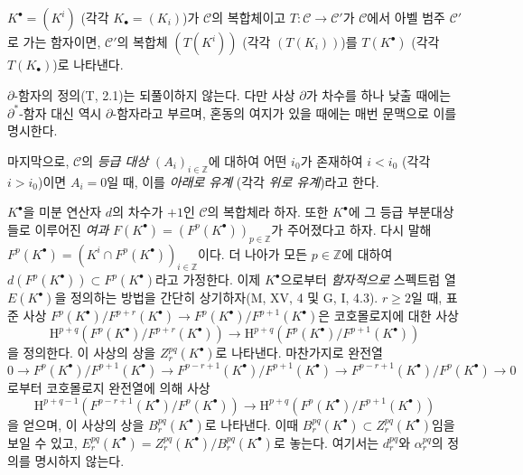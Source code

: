\begin{env}[11.2.1]
$K^\bullet=(K^i)$ (각각 $K_\bullet=(K_i)$)가 $\mathcal C$의 복합체이고
$T:\mathcal C\to\mathcal C'$가 $\mathcal C$에서 아벨 범주 $\mathcal C'$로
가는 함자이면, $\mathcal C'$의 복합체 $(T(K^i))$ (각각 $(T(K_i))$)를
$T(K^\bullet)$ (각각 $T(K_\bullet)$)로 나타낸다.

$\partial$-함자의 정의(T, 2.1)는 되풀이하지 않는다. 다만 사상
$\partial$가 차수를 하나 낮출 때에는 $\partial^*$-함자 대신 역시
$\partial$-함자라고 부르며, 혼동의 여지가 있을 때에는 매번 문맥으로 이를
명시한다.

마지막으로, $\mathcal C$의 \emph{등급 대상} $(A_i)_{i\in\mathbb Z}$에
대하여 어떤 $i_0$가 존재하여 $i<i_0$ (각각 $i>i_0$)이면 $A_i=0$일 때,
이를 \emph{아래로 유계} (각각 \emph{위로 유계})라고 한다.
\end{env}

\begin{env}[11.2.2]
\label{0.11.2.2-fr}
$K^\bullet$을 미분 연산자 $d$의 차수가 $+1$인 $\mathcal C$의 복합체라
하자. 또한 $K^\bullet$에 그 등급 부분대상들로 이루어진 \emph{여과}
$F(K^\bullet)=(F^p(K^\bullet))_{p\in\mathbb Z}$가 주어졌다고 하자. 다시
말해
$F^p(K^\bullet)=(K^i\cap F^p(K^\bullet))_{i\in\mathbb Z}$이다. 더 나아가
모든 $p\in\mathbb Z$에 대하여
$d(F^p(K^\bullet))\subset F^p(K^\bullet)$라고 가정한다. 이제
$K^\bullet$으로부터 \emph{함자적으로} 스펙트럼 열 $E(K^\bullet)$을
정의하는 방법을 간단히 상기하자(M, XV, 4 및 G, I, 4.3). $r\geq2$일 때,
표준 사상
$F^p(K^\bullet)/F^{p+r}(K^\bullet)\to
F^p(K^\bullet)/F^{p+1}(K^\bullet)$은 코호몰로지에 대한 사상
\[
  \mathrm H^{p+q}(F^p(K^\bullet)/F^{p+r}(K^\bullet))
  \longrightarrow
  \mathrm H^{p+q}(F^p(K^\bullet)/F^{p+1}(K^\bullet))
\]
을 정의한다. 이 사상의 상을 $Z_r^{pq}(K^\bullet)$로 나타낸다. 마찬가지로
완전열
\[
  0\to F^p(K^\bullet)/F^{p+1}(K^\bullet)
  \to F^{p-r+1}(K^\bullet)/F^{p+1}(K^\bullet)
  \to F^{p-r+1}(K^\bullet)/F^p(K^\bullet)\to0
\]
로부터 코호몰로지 완전열에 의해 사상
\[
  \mathrm H^{p+q-1}(F^{p-r+1}(K^\bullet)/F^p(K^\bullet))
  \longrightarrow
  \mathrm H^{p+q}(F^p(K^\bullet)/F^{p+1}(K^\bullet))
\]
을 얻으며, 이 사상의 상을 $B_r^{pq}(K^\bullet)$로 나타낸다. 이때
$B_r^{pq}(K^\bullet)\subset Z_r^{pq}(K^\bullet)$임을 보일 수 있고,
$E_r^{pq}(K^\bullet)=Z_r^{pq}(K^\bullet)/B_r^{pq}(K^\bullet)$로 놓는다.
여기서는 $d_r^{pq}$와 $\alpha_r^{pq}$의 정의를 명시하지 않는다.


\end{env}
